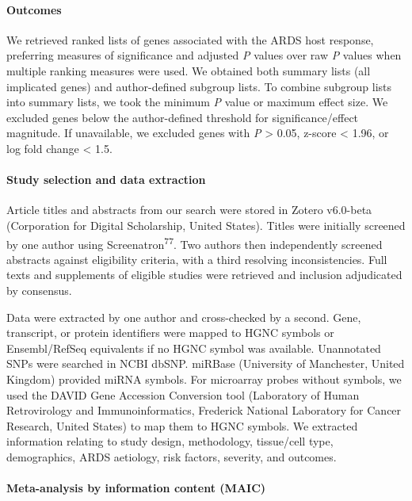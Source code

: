 \documentclass[
  11,
  a4paper,
]{article}
\let\oldparagraph\paragraph
\renewcommand{\paragraph}[1]{\oldparagraph{#1}\mbox{}}
\begin{document}
\hypertarget{outcomes}{%
\paragraph{Outcomes}\label{outcomes}}

We retrieved ranked lists of genes associated with the ARDS host
response, preferring measures of significance and adjusted \emph{P}
values over raw \emph{P} values when multiple ranking measures were
used. We obtained both summary lists (all implicated genes) and
author-defined subgroup lists. To combine subgroup lists into summary
lists, we took the minimum \emph{P} value or maximum effect size. We
excluded genes below the author-defined threshold for
significance/effect magnitude. If unavailable, we excluded genes with
\emph{P} \textgreater{} 0.05, z-score \textless{} 1.96, or log fold
change \textless{} 1.5.

\hypertarget{study-selection-and-data-extraction}{%
\paragraph{Study selection and data
extraction}\label{study-selection-and-data-extraction}}

Article titles and abstracts from our search were stored in Zotero
v6.0-beta (Corporation for Digital Scholarship, United States). Titles
were initially screened by one author using
Screenatron\textsuperscript{77}. Two authors then independently screened
abstracts against eligibility criteria, with a third resolving
inconsistencies. Full texts and supplements of eligible studies were
retrieved and inclusion adjudicated by consensus.

Data were extracted by one author and cross-checked by a second. Gene,
transcript, or protein identifiers were mapped to HGNC symbols or
Ensembl/RefSeq equivalents if no HGNC symbol was available. Unannotated
SNPs were searched in NCBI dbSNP. miRBase (University of Manchester,
United Kingdom) provided miRNA symbols. For microarray probes without
symbols, we used the DAVID Gene Accession Conversion tool (Laboratory of
Human Retrovirology and Immunoinformatics, Frederick National Laboratory
for Cancer Research, United States) to map them to HGNC symbols. We
extracted information relating to study design, methodology, tissue/cell
type, demographics, ARDS aetiology, risk factors, severity, and
outcomes.

\hypertarget{meta-analysis-by-information-content-maic-1}{%
\paragraph{Meta-analysis by information content
(MAIC)}\label{meta-analysis-by-information-content-maic-1}}
\end{document}
